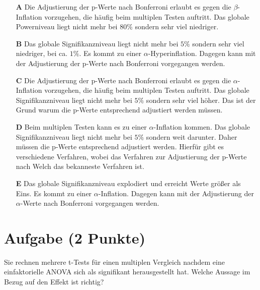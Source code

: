 \documentclass[a4paper, 9pt]{scrartcl}\usepackage[]{graphicx}\usepackage[]{xcolor}
\begin{document}
\begin{enumerate}
\item [\textbf{A} \msquare] Die Adjustierung der p-Werte nach Bonferroni erlaubt es gegen die $\beta$-Inflation vorzugehen, die häufig beim multiplen Testen auftritt. Das globale Powerniveau liegt nicht mehr bei $80\%$ sondern sehr viel niedriger.
\item [\textbf{B} \msquare] Das globale Signifikanzniveau liegt nicht mehr bei $5\%$ sondern sehr viel niedriger, bei ca. $1\%$. Es kommt zu einer $\alpha$-Hyperinflation. Dagegen kann mit der Adjustierung der p-Werte nach Bonferroni vorgegangen werden.
\item [\textbf{C} \msquare] Die Adjustierung der p-Werte nach Bonferroni erlaubt es gegen die $\alpha$-Inflation vorzugehen, die häufig beim multiplen Testen auftritt. Das globale Signifikanzniveau liegt nicht mehr bei $5\%$ sondern sehr viel höher. Das ist der Grund warum die p-Werte entsprechend adjustiert werden müssen.
\item [\textbf{D} \msquare] Beim multiplen Testen kann es zu einer $\alpha$-Inflation kommen. Das globale Signifikanzniveau liegt nicht mehr bei $5\%$ sondern weit darunter. Daher müssen die p-Werte entsprechend adjustiert werden. Hierfür gibt es verschiedene Verfahren, wobei das Verfahren zur Adjustierung der p-Werte nach Welch das bekanneste Verfahren ist.
\item [\textbf{E} \msquare] Das globale Signifikanzniveau explodiert und erreicht Werte größer als Eins. Es kommt zu einer $\alpha$-Inflation. Dagegen kann mit der Adjustierung der $\alpha$-Werte nach Bonferroni vorgegangen werden.
\end{enumerate}

\section{Aufgabe \hfill (2 Punkte)}




Sie rechnen mehrere t-Tests für einen multiplen Vergleich nachdem eine einfaktorielle ANOVA sich als signifikant herausgestellt hat. Welche Aussage im Bezug auf den Effekt ist richtig? 
\end{document}
